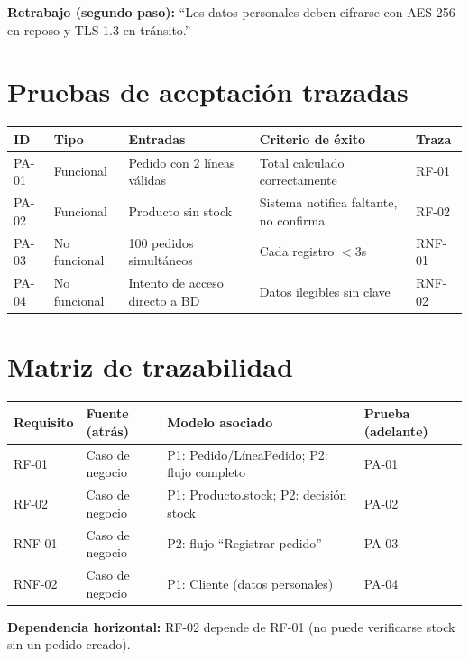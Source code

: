 \documentclass[11pt]{article}
\begin{document}
\textbf{Retrabajo (segundo paso):} ``Los datos personales deben cifrarse con AES-256 en reposo y TLS 1.3 en tránsito.''

\section{Pruebas de aceptación trazadas}

\begin{center}
\small
\begin{tabular}{p{1.1cm}p{2.2cm}p{3.6cm}p{3.6cm}p{1cm}}
\toprule
\textbf{ID} & \textbf{Tipo} & \textbf{Entradas} & \textbf{Criterio de éxito} & \textbf{Traza} \\
\midrule
PA-01 & Funcional & Pedido con 2 líneas válidas & Total calculado correctamente & RF-01 \\
PA-02 & Funcional & Producto sin stock & Sistema notifica faltante, no confirma & RF-02 \\
PA-03 & No funcional & 100 pedidos simultáneos & Cada registro $<3$s & RNF-01 \\
PA-04 & No funcional & Intento de acceso directo a BD & Datos ilegibles sin clave & RNF-02 \\
\bottomrule
\end{tabular}
\end{center}

\section{Matriz de trazabilidad}

\begin{center}
\scriptsize
\begin{tabular}{p{1.4cm}p{2.2cm}p{4.2cm}p{1.3cm}}
\toprule
\textbf{Requisito} & \textbf{Fuente (atrás)} & \textbf{Modelo asociado} & \textbf{Prueba (adelante)} \\
\midrule
RF-01 & Caso de negocio & P1: Pedido/LíneaPedido; P2: flujo completo & PA-01 \\
RF-02 & Caso de negocio & P1: Producto.stock; P2: decisión stock & PA-02 \\
RNF-01 & Caso de negocio & P2: flujo ``Registrar pedido'' & PA-03 \\
RNF-02 & Caso de negocio & P1: Cliente (datos personales) & PA-04 \\
\bottomrule
\end{tabular}
\end{center}

\textbf{Dependencia horizontal:} RF-02 depende de RF-01 (no puede verificarse stock sin un pedido creado).
\end{document}
